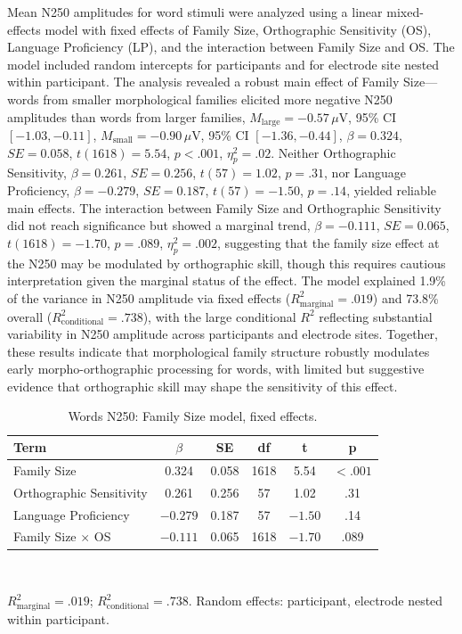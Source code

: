 \documentclass[11pt]{article}
\begin{document}
Mean N250 amplitudes for word stimuli were analyzed using a linear mixed-effects model with fixed effects of Family Size, Orthographic Sensitivity (OS), Language Proficiency (LP), and the interaction between Family Size and OS. The model included random intercepts for participants and for electrode site nested within participant. The analysis revealed a robust main effect of Family Size---words from smaller morphological families elicited more negative N250 amplitudes than words from larger families, $M_{\mathrm{large}} = -0.57\,\mu$V, 95\% CI $[-1.03, -0.11]$, $M_{\mathrm{small}} = -0.90\,\mu$V, 95\% CI $[-1.36, -0.44]$, $\beta = 0.324$, $SE = 0.058$, $t(1618) = 5.54$, $p < .001$, $\eta^2_p = .02$. Neither Orthographic Sensitivity, $\beta = 0.261$, $SE = 0.256$, $t(57) = 1.02$, $p = .31$, nor Language Proficiency, $\beta = -0.279$, $SE = 0.187$, $t(57) = -1.50$, $p = .14$, yielded reliable main effects. The interaction between Family Size and Orthographic Sensitivity did not reach significance but showed a marginal trend, $\beta = -0.111$, $SE = 0.065$, $t(1618) = -1.70$, $p = .089$, $\eta^2_p = .002$, suggesting that the family size effect at the N250 may be modulated by orthographic skill, though this requires cautious interpretation given the marginal status of the effect. The model explained 1.9\% of the variance in N250 amplitude via fixed effects ($R^2_{\mathrm{marginal}} = .019$) and 73.8\% overall ($R^2_{\mathrm{conditional}} = .738$), with the large conditional $R^2$ reflecting substantial variability in N250 amplitude across participants and electrode sites. Together, these results indicate that morphological family structure robustly modulates early morpho-orthographic processing for words, with limited but suggestive evidence that orthographic skill may shape the sensitivity of this effect.

\begin{table}[h!]
	\centering
	\small
	\caption{Words N250: Family Size model, fixed effects.}
	\label{tab:s1}
	\begin{tabular}{lccccc}
		\toprule
		\textbf{Term} & $\beta$ & \textbf{SE} & \textbf{df} & \textbf{t} & \textbf{p} \\
		\midrule
		Family Size & 0.324 & 0.058 & 1618 & 5.54 & $< .001$ \\
		Orthographic Sensitivity & 0.261 & 0.256 & 57 & 1.02 & .31 \\
		Language Proficiency & $-0.279$ & 0.187 & 57 & $-1.50$ & .14 \\
		Family Size $\times$ OS & $-0.111$ & 0.065 & 1618 & $-1.70$ & .089 \\
		\bottomrule
	\end{tabular}
	\\[4pt]
	\raggedright \footnotesize $R^2_{\mathrm{marginal}} = .019$; $R^2_{\mathrm{conditional}} = .738$. Random effects: participant, electrode nested within participant.
\end{table}
\end{document}
